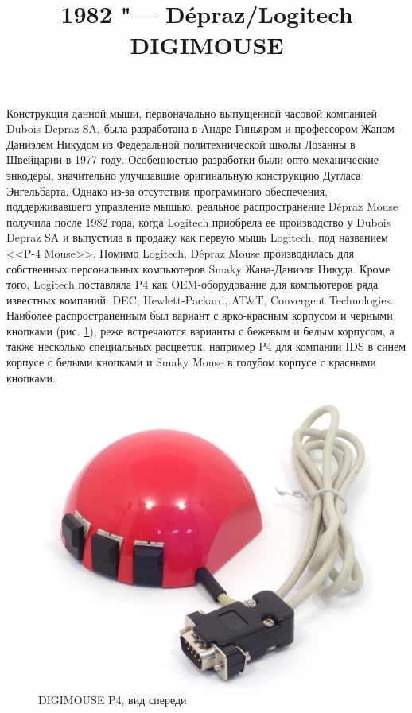 \documentclass[11pt, a4paper]{article}
\begin{document}
\title{1982 "--- Dépraz/Logitech DIGIMOUSE}
\date{}
\maketitle
{}
Конструкция данной мыши, первоначально выпущенной часовой компанией Dubois Depraz SA, была разработана в Андре Гиньяром и профессором Жаном-Даниэлем Никудом из Федеральной политехнической школы Лозанны в Швейцарии в 1977 году. Особенностью разработки были опто-механические энкодеры, значительно улучшавшие оригинальную конструкцию Дугласа Энгельбарта. Однако из-за отсутствия программного обеспечения, поддерживавшего управление мышью, реальное распространение Dépraz Mouse получила после 1982 года, когда Logitech приобрела ее производство у Dubois Depraz SA и выпустила в продажу как первую мышь Logitech, под названием <<P-4 Mouse>>.
Помимо Logitech, Dépraz Mouse производилась для собственных персональных компьютеров Smaky Жана-Даниэля Никуда. Кроме того, Logitech поставляла P4 как OEM-оборудование для компьютеров ряда известных компаний: DEC, Hewlett-Packard, AT\&T, Convergent Technologies. Наиболее распространенным был вариант с ярко-красным корпусом и черными кнопками (рис. \ref{fig:DIGIMOUSEP4Pic}); реже встречаются варианты с бежевым и белым корпусом, а также несколько специальных расцветок, например P4 для компании IDS в синем корпусе с белыми кнопками и Smaky Mouse в голубом корпусе с красными кнопками. 

\begin{figure}[h]
   \centering
    \includegraphics[scale=0.5]{1982_depraz_digimouse/pic_60.jpg}
    \caption{DIGIMOUSE P4, вид спереди}
    \label{fig:DIGIMOUSEP4Pic}
\end{figure}
\end{document}
